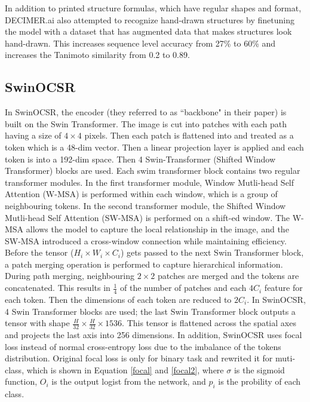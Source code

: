 \documentclass[12pt]{article}
\begin{document}
In addition to printed structure formulas, which have regular shapes and format, DECIMER.ai also attempted to recognize hand-drawn structures by finetuning the model with a dataset that has augmented data that makes structures look hand-drawn. This increases sequence level accuracy from 27\% to 60\% and increases the Tanimoto similarity from 0.2 to 0.89.
\autocite{decimer} 

\subsection{SwinOCSR}
In SwinOCSR, the encoder (they referred to as ``backbone" in their paper) is built on the Swin Transformer. The image is cut into patches with each path having a size of $4 \times 4$ pixels. Then each patch is flattened into and treated as a token which is a 48-dim vector. Then a linear projection layer is applied and each token is into a 192-dim space. 
Then 4 Swin-Transformer (Shifted Window Transformer) \autocite{swin_tran} blocks are used. Each swim transformer block contains two regular transformer modules. In the first transformer module, Window Mutli-head Self Attention (W-MSA) is performed within each window, which is a group of neighbouring tokens. In the second transformer module, the Shifted Window Mutli-head Self Attention (SW-MSA) is performed on a shift-ed window. The W-MSA allows the model to capture the local relationship in the image, and the SW-MSA introduced a cross-window connection while maintaining efficiency. Before the tensor ($H_i \times W_i \times C_i$) gets passed to the next Swin Transformer block, a patch merging operation is performed to capture hierarchical information. During path merging, neighbouring $2 \times 2$ patches are merged and the tokens are concatenated. This results in $\frac{1}{4}$ of the number of patches and each $4C_i$ feature for each token. Then the dimensions of each token are reduced to $2C_i$. In SwinOCSR, 4 Swin Transformer blocks are used; the last Swin Transformer block outputs a tensor with shape $\frac{H}{32} \times \frac{H}{32} \times 1536$. This tensor is flattened across the spatial axes and projects the last axis into 256 dimensions. 
In addition, SwinOCSR uses focal loss \autocite{lin_focal_2018} instead of normal cross-entropy loss due to the imbalance of the tokens distribution. \cite{swinocsr} Original focal loss is only for binary task and \autocite{swinocsr} rewrited it for muti-class, which is shown in Equation \ref{focal} and \ref{focal2}, where $\sigma$ is the sigmoid function, $O_i$ is the output logist from the network, and $p_i$ is the probility of each class. 
\end{document}

